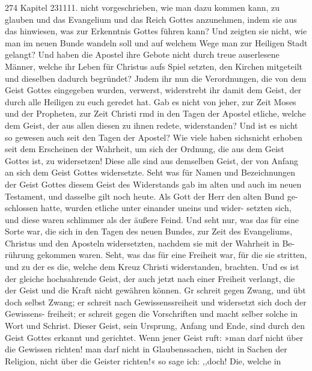 274 Kapitel 231111.
nicht vorgeschrieben, wie man dazu kommen kann, zu glauben und
das Evangelium und das Reich Gottes anzunehmen, indem
sie aus das hinwiesen, was zur Erkenntnis Gottes führen kann?
Und zeigten sie nicht, wie man im neuen Bunde wandeln soll
und auf welchem Wege man zur Heiligen Stadt gelangt? Und
haben die Apostel ihre Gebote nicht durch treue auserlesene Männer,
welche ihr Leben für Christus aufs Spiel setzten, den Kirchen
mitgeteilt und dieselben dadurch begründet? Jndem ihr nun die
Verordnungen, die von dem Geist Gottes eingegeben wurden,
verwerst, widerstrebt ihr damit dem Geist, der durch alle Heiligen
zu euch geredet hat. Gab es nicht von jeher, zur Zeit Moses und
der Propheten, zur Zeit Christi rmd in den Tagen der Apostel
etliche, welche dem Geist, der aus allen diesen zu ihnen redete,
widerstanden? Und ist es nicht so gewesen auch seit den Tagen der
Apostel? Wie viele haben sichsnicht erhoben seit dem Erscheinen
der Wahrheit, um sich der Ordnung, die aus dem Geist Gottes
ist, zu widersetzen! Diese alle sind aus demselben Geist, der von
Anfang an sich dem Geist Gottes widersetzte. Seht was für
Namen und Bezeichnungen der Geist Gottes diesem Geist des
Widerstands gab im alten und auch im neuen Testament, und
dasselbe gilt noch heute. Als Gott der Herr den alten Bund ge-
schlossen hatte, wurden etliche unter einander uneins und wider-
setzten sich, und diese waren schlimmer als der äußere Feind.
Und seht nur, was das für eine Sorte war, die sich in den Tagen
des neuen Bundes, zur Zeit des Evangeliums, Christus und den
Aposteln widersetzten, nachdem sie mit der Wahrheit in Be-
rührung gekommen waren. Seht, was das für eine Freiheit war,
für die sie stritten, und zu der es die, welche dem Kreuz Christi
widerstanden, brachten.
Und es ist der gleiche hochsahrende Geist, der auch jetzt nach
einer Freiheit verlangt, die der Geist und die Kraft nicht gewähren
können. Gr schreit gegen Zwang, und übt doch selbst Zwang; er
schreit nach Gewissenssreiheit und widersetzt sich doch der Gewissens-
freiheit; er schreit gegen die Vorschriften und macht selber solche
in Wort und Schrist. Dieser Geist, sein Ursprung, Anfang und
Ende, sind durch den Geist Gottes erkannt und gerichtet. Wenn
jener Geist ruft: »man darf nicht über die Gewissen richten! man
darf nicht in Glaubenssachen, nicht in Sachen der Religion, nicht
über die Geister richten!« so sage ich: ,,doch! Die, welche in


